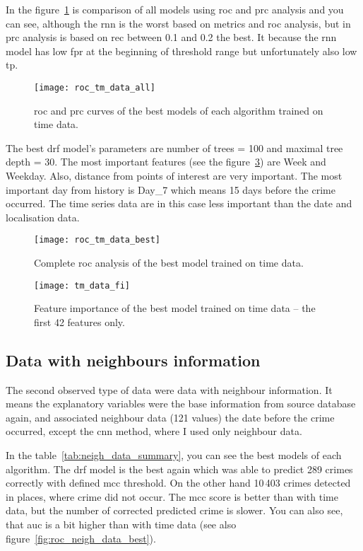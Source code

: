\documentclass[thesis=M,english]{FITthesis}[2012/10/20]
\begin{document}
In the figure~\ref{fig:roc_tm_data_all} is comparison of all models using \gls{roc} and \gls{prc} analysis and you can see, although the \gls{rnn} is the worst based on metrics and \gls{roc} analysis, but in \gls{prc} analysis is based on \gls{rec} between 0.1 and 0.2 the best. It because the \gls{rnn} model has low \gls{fpr} at the beginning of threshold range but unfortunately also low \gls{tp}.   


\begin{figure}[ht]\centering
    \texttt{[image: roc\_tm\_data\_all]}\label{fig:roc_tm_data_all}
    \caption{\gls{roc} and \gls{prc} curves of the best models of each algorithm trained on time data.}
\end{figure}

The best \gls{drf} model's parameters are number of trees = 100 and maximal tree depth = 30. The most important features (see the figure~\ref{fig:tm_data_fi}) are Week and Weekday. Also, distance from points of interest are very important. The most important day from history is Day\_7 which means 15 days before the crime occurred. The time series data are in this case less important than the date and localisation data. 

\begin{figure}[ht]\centering
    \texttt{[image: roc\_tm\_data\_best]}\label{fig:roc_tm_data_best}
    \caption{Complete \gls{roc} analysis of the best model trained on time data.}
\end{figure}

\begin{figure}[ht]\centering
    \texttt{[image: tm\_data\_fi]}\label{fig:tm_data_fi}
    \caption{Feature importance of the best model trained on time data -- the first 42 features only.}
\end{figure}

\newpage
\subsection{Data with neighbours information}\label{sec:neigh_information}

The second observed type of data were data with neighbour information. It means the explanatory variables were the base information from source database again, and associated neighbour data (121 values) the date before the crime occurred, except the \gls{cnn} method, where I used only neighbour data.  

In the table~\ref{tab:neigh_data_summary}, you can see the best models of each algorithm. The \gls{drf} model is the best again which was able to predict 289 crimes correctly with defined \gls{mcc} threshold. On the other hand 10\,403 crimes detected in places, where crime did not occur. The \gls{mcc} score is better than with time data, but the number of corrected predicted crime is slower. You can also see, that \gls{auc} is a bit higher than with time data (see also figure~\ref{fig:roc_neigh_data_best}).
\end{document}
